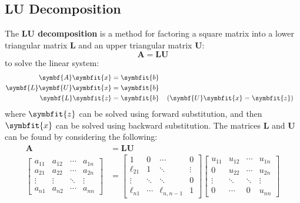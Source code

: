 \documentclass{article}
\begin{document}
\subsection{LU Decomposition}
The \textbf{LU decomposition} is a method for factoring a square matrix
into a lower triangular matrix \(\symbf{L}\) and an upper triangular
matrix \(\symbf{U}\):
\begin{equation*}
    \symbf{A} = \symbf{L} \symbf{U}
\end{equation*}
to solve the linear system:
\begin{align*}
    \symbf{A} \symbfit{x}           & = \symbfit{b}                                                         \\
    \symbf{L} \symbf{U} \symbfit{x} & = \symbfit{b}                                                         \\
    \symbf{L} \symbfit{z}           & = \symbfit{b} &  & \left( \symbf{U} \symbfit{x} = \symbfit{z} \right)
\end{align*}
where \(\symbfit{z}\) can be solved using forward substitution, and then
\(\symbfit{x}\) can be solved using backward substitution. The matrices
\(\symbf{L}\) and \(\symbf{U}\) can be found by considering the
following:
\begin{align*}
    \symbf{A} & = \symbf{L} \symbf{U} \\
    \begin{bmatrix*}
        a_{11} & a_{12} & \cdots & a_{1n} \\
        a_{21} & a_{22} & \cdots & a_{2n} \\
        \vdots & \vdots & \ddots & \vdots \\
        a_{n1} & a_{n2} & \cdots & a_{nn}
    \end{bmatrix*}
              & =
    \begin{bmatrix*}
        1 & 0      & \cdots & 0      \\
        \ell_{21} & 1 & \ddots & \vdots      \\
        \vdots & \ddots & \ddots & 0 \\
        \ell_{n1} & \cdots & \ell_{n,n-1} & 1
    \end{bmatrix*}
    \begin{bmatrix*}
        u_{11} & u_{12} & \cdots & u_{1n} \\
        0      & u_{22} & \cdots & u_{2n} \\
        \vdots & \ddots & \ddots & \vdots \\
        0      & \cdots & 0      & u_{nn}
    \end{bmatrix*}
\end{align*}
\end{document}
